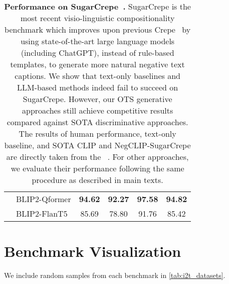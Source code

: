 \documentclass{article} \usepackage{iclr2024_conference,times}
\begin{document}
\begin{table}[h!]
{\begin{NiceTabular}{llccc|c}
& BLIP2-Qformer & {\bf 94.62} & {\bf 92.27} & {\bf 97.58} & {\bf 94.82} \\
& BLIP2-FlanT5 & 85.69 & 78.80 & 91.76 & 85.42 \\
\bottomrule
\end{NiceTabular}
}
\caption{\small {\bf Performance on SugarCrepe~\citep{sugarcrepe}.} SugarCrepe is the most recent visio-linguistic compositionality benchmark which improves upon previous Crepe~\citep{crepe} by using state-of-the-art large language models (including ChatGPT), instead of rule-based templates, to generate more natural negative text captions. We show that text-only baselines and LLM-based methods indeed fail to succeed on SugarCrepe. However, our OTS generative approaches still achieve competitive results compared against SOTA discriminative approaches. The results of human performance, text-only baseline, and SOTA CLIP and NegCLIP-SugarCrepe are directly taken from the ~\citet{sugarcrepe}. For other approaches, we evaluate their performance following the same procedure as described in main texts.}
\label{tab:sugar_crepe}
\end{table}

\clearpage

\section{Benchmark Visualization}
\label{app:dataset_visualization}
We include random samples from each benchmark in \autoref{tab:i2t_datasets}.
\end{document}
